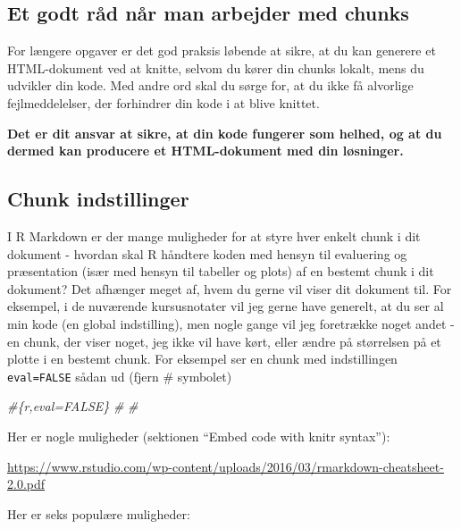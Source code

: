 \documentclass[
]{book}
\newenvironment{Shaded}{\begin{snugshade}}{\end{snugshade}}
\newcommand{\CommentTok}[1]{\textcolor[rgb]{0.56,0.35,0.01}{\textit{#1}}}
\begin{document}
\subsection{Et godt råd når man arbejder med chunks}\label{et-godt-ruxe5d-nuxe5r-man-arbejder-med-chunks}

For længere opgaver er det god praksis løbende at sikre, at du kan generere et HTML-dokument ved at knitte, selvom du kører din chunks lokalt, mens du udvikler din kode. Med andre ord skal du sørge for, at du ikke få alvorlige fejlmeddelelser, der forhindrer din kode i at blive knittet.

\textbf{Det er dit ansvar at sikre, at din kode fungerer som helhed, og at du dermed kan producere et HTML-dokument med din løsninger.}

\subsection{Chunk indstillinger}\label{chunk-indstillinger}

I R Markdown er der mange muligheder for at styre hver enkelt chunk i dit dokument - hvordan skal R håndtere koden med hensyn til evaluering og præsentation (især med hensyn til tabeller og plots) af en bestemt chunk i dit dokument? Det afhænger meget af, hvem du gerne vil viser dit dokument til. For eksempel, i de nuværende kursusnotater vil jeg gerne have generelt, at du ser al min kode (en global indstilling), men nogle gange vil jeg foretrække noget andet - en chunk, der viser noget, jeg ikke vil have kørt, eller ændre på størrelsen på et plotte i en bestemt chunk. For eksempel ser en chunk med indstillingen \texttt{eval=FALSE} sådan ud (fjern \# symbolet)

\begin{Shaded}
\begin{Highlighting}[]
\CommentTok{\#\textasciigrave{}\textasciigrave{}\textasciigrave{}\{r,eval=FALSE\}}
\CommentTok{\#}
\CommentTok{\#\textasciigrave{}\textasciigrave{}\textasciigrave{}}
\end{Highlighting}
\end{Shaded}

Her er nogle muligheder (sektionen ``Embed code with knitr syntax''):

\url{https://www.rstudio.com/wp-content/uploads/2016/03/rmarkdown-cheatsheet-2.0.pdf}

Her er seks populære muligheder:
\end{document}
